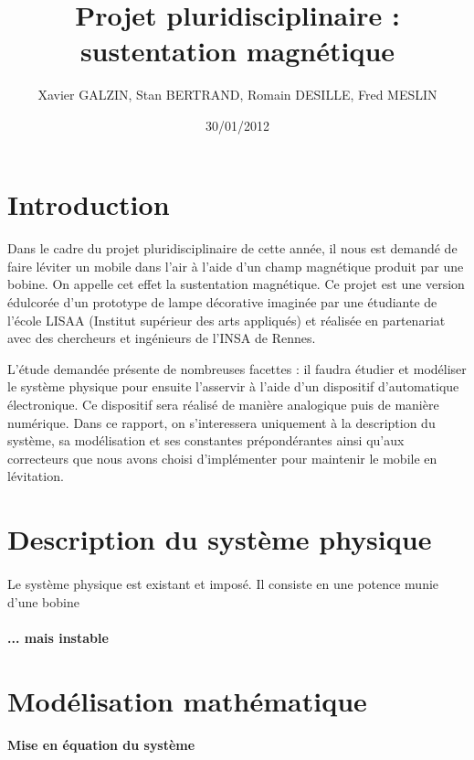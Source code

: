 \documentclass[11pt, french]{article} %
\title{Projet pluridisciplinaire : sustentation magnétique}
\author{ Xavier GALZIN, Stan BERTRAND, Romain DESILLE, Fred MESLIN}
\date{30/01/2012}
\begin{document}
\maketitle
\pagebreak

\section{Introduction}
\paragraph{}
	Dans le cadre du projet pluridisciplinaire de cette année, il nous est demandé de faire léviter un mobile dans l'air à l'aide d'un champ magnétique produit par une bobine. On appelle cet effet la sustentation magnétique. Ce projet est une version édulcorée d'un prototype de lampe décorative imaginée par une étudiante de l'école LISAA (Institut supérieur des arts appliqués) et réalisée en partenariat avec des chercheurs et ingénieurs de l'INSA de Rennes.

L'étude demandée présente de nombreuses facettes : il faudra étudier et modéliser le système physique pour ensuite l'asservir à l'aide d'un dispositif d'automatique électronique. Ce dispositif sera réalisé de manière analogique puis de manière numérique. Dans ce rapport, on s'interessera uniquement à la description du système, sa modélisation et ses constantes prépondérantes ainsi qu'aux correcteurs que nous avons choisi d'implémenter pour maintenir le mobile en lévitation.

\section{Description du système physique}
\paragraph{}
Le système physique est existant et imposé. Il consiste en une potence munie d'une bobine

\paragraph{... mais instable}

\section{Modélisation mathématique}

\paragraph{Mise en équation du système}
\end{document}
